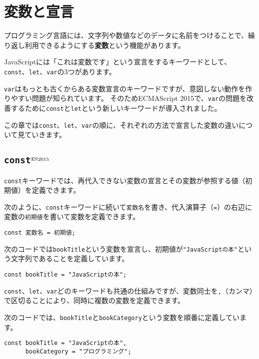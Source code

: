 \hypertarget{variable-and-declaration}{%
\chapter{変数と宣言}\label{variable-and-declaration}}

プログラミング言語には、文字列や数値などのデータに名前をつけることで、繰り返し利用できるようにする\textbf{変数}という機能があります。

JavaScriptには「これは変数です」という宣言をするキーワードとして、
\texttt{const}、\texttt{let}、\texttt{var}の3つがあります。

\texttt{var}はもっとも古くからある変数宣言のキーワードですが、意図しない動作を作りやすい問題が知られています。
そのためECMAScript
2015で、\texttt{var}の問題を改善するために\texttt{const}と\texttt{let}という新しいキーワードが導入されました。

この章では\texttt{const}、\texttt{let}、\texttt{var}の順に、それぞれの方法で宣言した変数の違いについて見ていきます。

\hypertarget{const}{%
\section{\texttt{const}{$^{\rm ES2015}$}}\label{const}}

\texttt{const}キーワードでは、再代入できない変数の宣言とその変数が参照する値（初期値）を定義できます。

次のように、\texttt{const}キーワードに続いて\texttt{変数名}を書き、代入演算子（\texttt{=}）の右辺に変数の\texttt{初期値}を書いて変数を定義できます。

\begin{lstlisting}
const 変数名 = 初期値;
\end{lstlisting}

次のコードでは\texttt{bookTitle}という変数を宣言し、初期値が\texttt{"JavaScriptの本"}という文字列であることを定義しています。

\begin{lstlisting}
const bookTitle = "JavaScriptの本";
\end{lstlisting}

\texttt{const}、\texttt{let}、\texttt{var}どのキーワードも共通の仕組みですが、変数同士を\texttt{,}（カンマ）で区切ることにより、同時に複数の変数を定義できます。

次のコードでは、\texttt{bookTitle}と\texttt{bookCategory}という変数を順番に定義しています。

\begin{lstlisting}
const bookTitle = "JavaScriptの本",
      bookCategory = "プログラミング";
\end{lstlisting}

